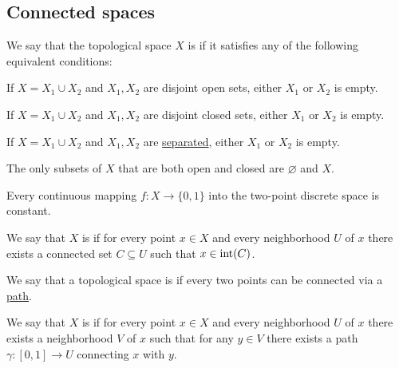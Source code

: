 \subsection{Connected spaces}\label{subsec:connected_sets}

\begin{definition}\label{def:connected_space}
  We say that the topological space \( X \) is  if it satisfies any of the following equivalent conditions:
  \begin{thmenum}
     If \( X = X_1 \cup X_2 \) and \( X_1, X_2 \) are disjoint open sets, either \( X_1 \) or \( X_2 \) is empty.

     If \( X = X_1 \cup X_2 \) and \( X_1, X_2 \) are disjoint closed sets, either \( X_1 \) or \( X_2 \) is empty.

     If \( X = X_1 \cup X_2 \) and \( X_1, X_2 \) are \hyperref[def:topological_space_separation]{separated}, either \( X_1 \) or \( X_2 \) is empty.

     The only subsets of \( X \) that are both open and closed are \( \varnothing \) and \( X \).

     Every continuous mapping \( f: X \to \{ 0, 1 \} \) into the two-point discrete space is constant.
  \end{thmenum}
\end{definition}

\begin{definition}\label{def:locally_connected}
  We say that \( X \) is  if for every point \( x \in X \) and every neighborhood \( U \) of \( x \) there exists a connected set \( C \subseteq U \) such that \( x \in \operatorname{int}(C) \).
\end{definition}

\begin{definition}\label{def:path_connected}
  We say that a topological space is  if every two points can be connected via a \hyperref[def:parametric_curve]{path}.
\end{definition}

\begin{definition}\label{def:locally_path_connected}
  We say that \( X \) is  if for every point \( x \in X \) and every neighborhood \( U \) of \( x \) there exists a neighborhood \( V \) of \( x \) such that for any \( y \in V \) there exists a path \( \gamma: [0, 1] \to U \) connecting \( x \) with \( y \).
\end{definition}


